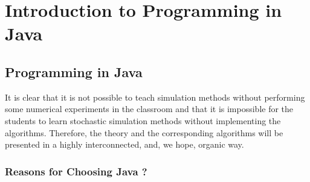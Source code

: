 \chapter{Introduction to Programming in Java}
\label{chap:IntroJava}

\section{Programming in Java}
\label{sec:Programming}

It is clear that it is not possible to teach simulation methods without 
performing some numerical experiments in the classroom and that it is 
impossible for the students to learn stochastic simulation methods without 
implementing the algorithms. Therefore, the theory and the corresponding 
algorithms will be presented in a highly interconnected, and, we 
hope, organic way.



\subsection{Reasons for Choosing Java ?}
\label{sec:Programming_languages}

